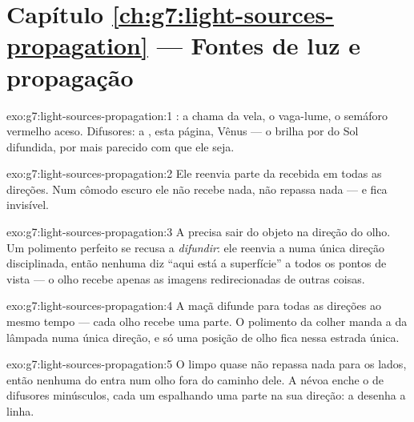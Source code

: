 \section*{Capítulo \ref{ch:g7:light-sources-propagation} --- Fontes de luz e propagação}

\begin{solution}{exo:g7:light-sources-propagation:1}
: a chama da vela, o vaga-lume, o semáforo vermelho
aceso. Difusores: a , esta página, Vênus --- o  brilha por
 do Sol difundida, por mais parecido com  que ele seja.
\end{solution}

\begin{solution}{exo:g7:light-sources-propagation:2}
Ele reenvia parte da  recebida em todas as direções. Num cômodo
escuro ele não recebe nada, não repassa nada --- e fica invisível.
\end{solution}

\begin{solution}{exo:g7:light-sources-propagation:3}
A  precisa sair do objeto na direção do olho. Um polimento
perfeito se recusa a \emph{difundir}: ele reenvia a  numa única
direção disciplinada, então nenhuma  diz ``aqui está a
superfície'' a todos os pontos de vista --- o olho recebe apenas as
imagens redirecionadas de outras coisas.
\end{solution}

\begin{solution}{exo:g7:light-sources-propagation:4}
A maçã difunde para todas as direções ao mesmo tempo --- cada olho
recebe uma parte. O polimento da colher manda a  da lâmpada numa
única direção, e só uma posição de olho fica nessa estrada única.
\end{solution}

\begin{solution}{exo:g7:light-sources-propagation:5}
O  limpo quase não repassa nada para os lados, então nenhuma  do
 entra num olho fora do caminho dele. A névoa enche o  de
difusores minúsculos, cada um espalhando uma parte na sua direção: a
 desenha a linha.
\end{solution}

